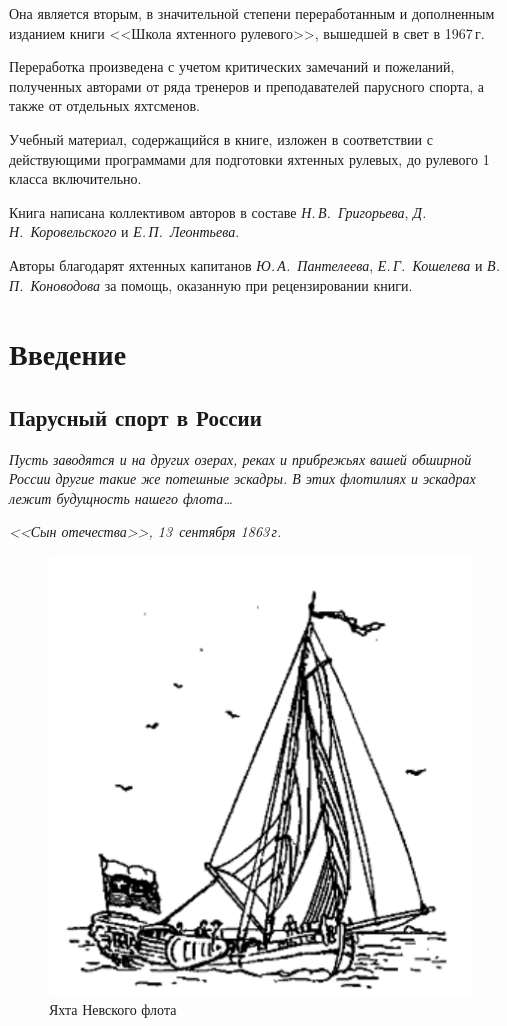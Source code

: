 \documentclass[a4paper, 12pt, twoside, final]{scrbook}
\begin{document}
Она является вторым, в значительной степени переработанным и дополненным изданием книги <<Школа яхтенного рулевого>>, вышедшей в свет в 1967\,г. 

Переработка произведена с учетом критических замечаний и пожеланий, полученных авторами от ряда тренеров и преподавателей парусного спорта, а также от отдельных яхтсменов. 

Учебный материал, содержащийся в книге, изложен в соответствии с действующими программами для подготовки яхтенных рулевых, до рулевого 1 класса включительно.

Книга написана коллективом авторов в составе \textit{Н.\,В.~Григорьева}, \textit{Д.\,Н.~Коровельского} и \textit{Е.\,П.~Ле\-онтьева}.

Авторы благодарят яхтенных капитанов \textit{Ю.\,А.~Пантелеева},  \textit{Е.\,Г.~Кошелева} и  \textit{В.\,П.~Коноводова} за помощь, оказанную при рецензировании книги.

\mainmatter

\chapter{Введение}
\section{Парусный спорт в России}

\epigraph{\emph{Пусть заводятся и на других озерах, реках и прибрежьях вашей обширной России другие такие же потешные эскадры. В этих флотилиях и эскадрах лежит будущность нашего флота\ldots}}{\emph{<<Сын отечества>>, 13~сентября 1863\,г.}}

\begin{figure}
\centering
\includegraphics{Yahta_Nevskogo_flota}
\caption{Яхта Невского флота}
\end{figure}
\end{document}
